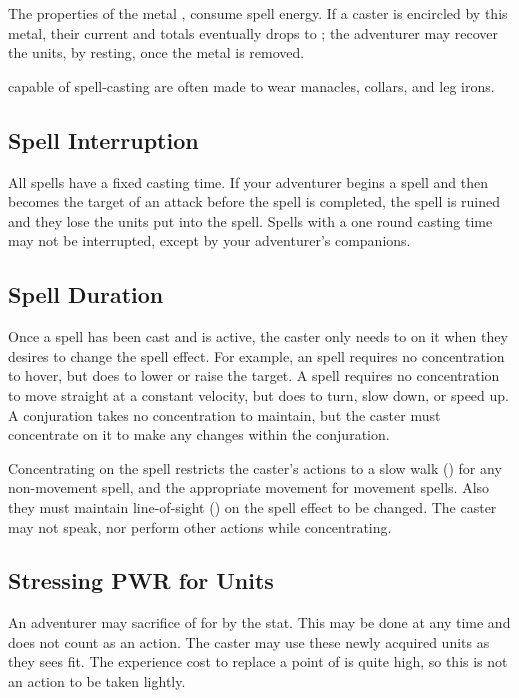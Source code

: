 \begin{multicols}{2}
The properties of the metal , consume spell energy. If a caster is encircled by this metal, their current \EU and \DU totals eventually drops to ; the adventurer may recover the units, by resting, once the metal is removed. 

 capable of spell-casting are often made to wear manacles, collars, and leg irons.
\subsection{Spell Interruption}
All spells have a fixed casting time. If your adventurer begins a spell and then becomes the target of an attack before the spell is completed, the spell is ruined and they lose the units put into the spell. Spells with a one round casting time may not be interrupted, except by your adventurer's companions. 

\subsection{Spell Duration}
Once a spell has been cast and is active, the caster only needs to  on it when they desires to change the spell effect. For example, an  spell requires no concentration to hover, but does to lower or raise the target. A  spell requires no concentration to move straight at a constant velocity, but does to turn, slow down, or speed up. A conjuration takes no concentration to maintain, but the caster must concentrate on it to make any changes within the conjuration.

Concentrating on the spell restricts the caster's actions to a slow walk () for any non-movement spell, and the appropriate movement for movement spells. Also they must maintain line-of-sight () on the spell effect to be changed. The caster may not speak, nor perform other actions while concentrating.
\subsection{Stressing PWR for Units}
An adventurer may sacrifice  of \PWR for  by  the stat. This may be done at any time and does not count as an action. The caster may use these newly acquired units as they sees fit. The experience cost to replace a point of \PWR is quite high, so this is not an action to be taken lightly.

\end{multicols}
